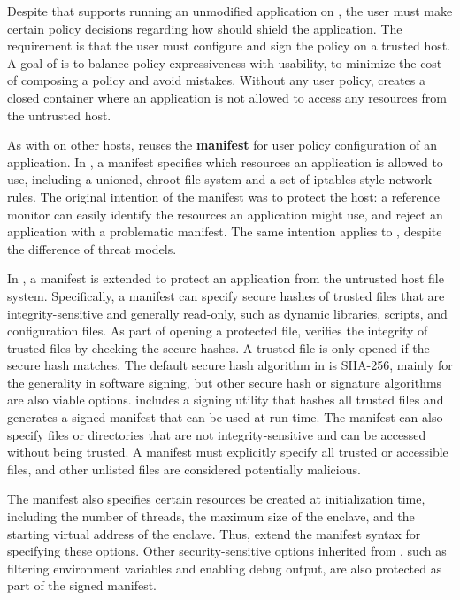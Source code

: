 \label{sec:sgx:overview:config}


Despite that \graphenesgx{} supports running an unmodified application on \sgx{},
the user must make certain policy decisions
regarding how \graphenesgx{} should shield the application.
The requirement is that
the user must configure and sign the policy on a trusted host.
A goal of \graphenesgx{} is to balance policy expressiveness
with usability,
to minimize the cost of composing a policy and avoid mistakes.
Without any user policy, \graphenesgx{} creates a closed container
where an application
is not allowed to access any resources
from the untrusted host.


As with \graphene{} on other hosts,
\graphenesgx{} reuses the {\bf manifest} for user policy configuration of an application.
In \graphene{},
a manifest specifies which resources an application is allowed to use, including
a unioned, chroot file system
and a set of iptables-style network rules.
The original intention of the manifest was to protect the host:
a reference monitor
can easily identify the resources an application might use, and reject an application
with a problematic manifest.
The same intention
applies to \graphenesgx{}, despite the difference of threat models.


In \graphenesgx{}, a manifest is extended to protect an application from the untrusted host file system.
Specifically, a manifest can specify secure hashes of trusted files that are integrity-sensitive and generally read-only,
such as dynamic libraries, scripts, and configuration files.
As part of opening a protected file,
\graphenesgx{} verifies the integrity of trusted files by checking the secure hashes.
A trusted file is only opened if the secure hash matches.
The default secure hash algorithm
in \graphenesgx{} is SHA-256, mainly for the generality in software signing,
but other secure hash or signature algorithms
are also viable options.
\graphenesgx{} includes a signing utility that hashes all trusted files and generates a signed manifest that can be used at run-time.
The manifest can also specify files or directories that
are not integrity-sensitive
and can be accessed without being trusted.
A manifest must explicitly specify all trusted or accessible files,
and other unlisted files
are considered potentially malicious.



The manifest also specifies certain resources be created at initialization time,
including the number of threads,
the maximum size of the enclave, and the starting virtual address of the enclave.
Thus, \graphenesgx{} extend the \graphene{} manifest syntax for  specifying these options.
Other security-sensitive options inherited from \graphene{}, such as filtering environment variables
and enabling debug output, are also protected as part of the signed manifest.



